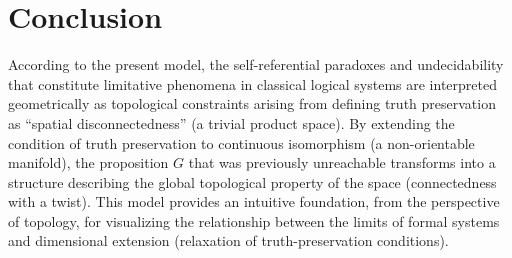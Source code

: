 \documentclass[11pt,a4paper]{article}
\theoremstyle{definition}
\begin{document}
\section{Conclusion}

According to the present model, the self-referential paradoxes and undecidability that constitute limitative phenomena in classical logical systems are interpreted geometrically as topological constraints arising from defining truth preservation as ``spatial disconnectedness'' (a trivial product space). By extending the condition of truth preservation to continuous isomorphism (a non-orientable manifold), the proposition $G$ that was previously unreachable transforms into a structure describing the global topological property of the space (connectedness with a twist). This model provides an intuitive foundation, from the perspective of topology, for visualizing the relationship between the limits of formal systems and dimensional extension (relaxation of truth-preservation conditions).
\end{document}
